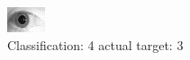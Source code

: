 \begin{figure}[h!]
\begin{center}
\includegraphics[width=0.60\columnwidth]{figures/ID1821_class_4_target_3.png}
\end{center}
\caption{ Classification: 4 actual target: 3}
\label{fig:ID1821_class_4_target_3}
\end{figure}
